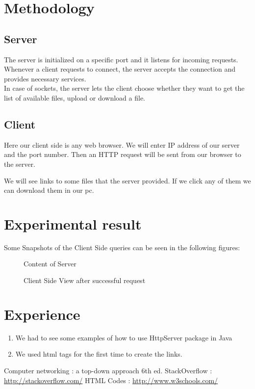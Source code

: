 \documentclass[11pt]{article}
\begin{document}
\section{Methodology}

\subsection{Server}
The server is initialized on a specific port and it listens for incoming requests. Whenever a client requests to connect, the server accepts the connection and provides necessary services.\\
In case of sockets, the server lets the client choose whether they want to get the list of available files, upload or download a file. 

\subsection{Client}
Here our client side is any web browser. We will enter IP address of our server and the port number. Then an HTTP request will be sent from our browser to the server. 

We will see links to some files that the server provided. If we click any of them we can download them in our pc.

\section{Experimental result}

Some Snapshots of the Client Side queries can be seen in the following figures: 
\begin{figure}[!h]
\centering
\caption{Content of Server}
\end{figure}

\begin{figure}[!h]
\centering
\caption{Client Side View after successful request}
\end{figure}


\newpage
\section{Experience}
\begin{enumerate}
\item We had to see some examples of how to use HttpServer package in Java
\item We used html tags for the first time to create the links.
\end{enumerate}

\begin{thebibliography}{1}
  Computer networking : a top-down approach 6th ed.
 StackOverflow : \url{http://stackoverflow.com/}
 HTML Codes : \url{http://www.w3schools.com/}
\end{thebibliography}
\end{document}
